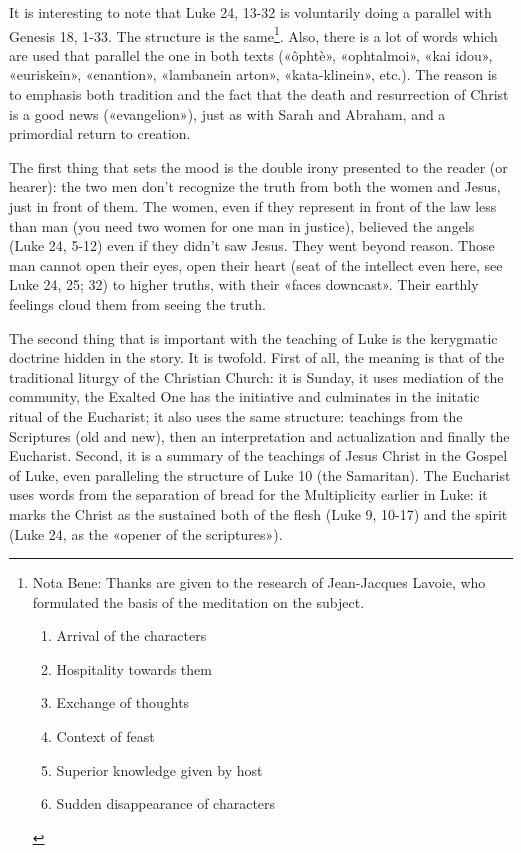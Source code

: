 It is interesting to note that Luke 24, 13-32 is voluntarily doing a parallel with Genesis 18, 1-33. The structure is the same\footnote{Nota Bene: Thanks are given to the research of Jean-Jacques Lavoie, who formulated the basis of the meditation on the subject.
\begin{enumerate}
\item Arrival of the characters
\item Hospitality towards them
\item Exchange of thoughts
\item Context of feast
\item Superior knowledge given by host
\item Sudden disappearance of characters
\end{enumerate}}. Also, there is a lot of words which are used that parallel the one in both texts («ôphtè», «ophtalmoi», «kai idou», «euriskein», «enantion», «lambanein arton», «kata-klinein», etc.). The reason is to emphasis both tradition and the fact that the death and resurrection of Christ is a good news («evangelion»), just as with Sarah and Abraham, and a primordial return to creation.

The first thing that sets the mood is the double irony presented to the reader (or hearer): the two men don't recognize the truth from both the women and Jesus, just in front of them. The women, even if they represent in front of the law less than man (you need two women for one man in justice), believed the angels (Luke 24, 5-12) even if they didn't saw Jesus. They went beyond reason. Those man cannot open their eyes, open their heart (seat of the intellect even here, see Luke 24, 25; 32) to higher truths, with their «faces downcast». Their earthly feelings cloud them from seeing the truth.

The second thing that is important with the teaching of Luke is the kerygmatic doctrine hidden in the story. It is twofold. First of all, the meaning is that of the traditional liturgy of the Christian Church: it is Sunday, it uses mediation of the community, the Exalted One has the initiative and culminates in the initatic ritual of the Eucharist; it also uses the same structure: teachings from the Scriptures (old and new), then an interpretation and actualization and finally the Eucharist. Second, it is a summary of the teachings of Jesus Christ in the Gospel of Luke, even paralleling the structure of Luke 10 (the Samaritan). The Eucharist uses words from the separation of bread for the Multiplicity earlier in Luke: it marks the Christ as the sustained both of the flesh (Luke 9, 10-17) and the spirit (Luke 24, as the «opener of the scriptures»).

